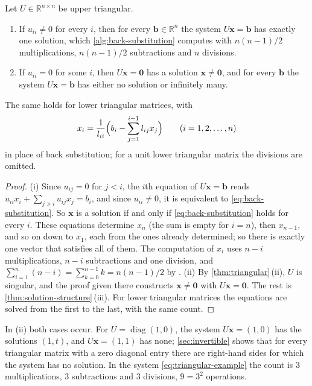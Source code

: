 \begin{proposition}
\label{prop:triangular-solve}
Let $U\in\mathbb R^{n\times n}$ be upper triangular.
\begin{enumerate}
\item If $u_{ii}\ne0$ for every $i$, then for every $\mathbf b\in\mathbb R^n$ the system $U\mathbf x=\mathbf b$ has exactly one solution, which \cref{alg:back-substitution} computes with $n(n-1)/2$ multiplications, $n(n-1)/2$ subtractions and $n$ divisions.
\item If $u_{ii}=0$ for some $i$, then $U\mathbf x=\mathbf 0$ has a solution $\mathbf x\ne\mathbf 0$, and for every $\mathbf b$ the system $U\mathbf x=\mathbf b$ has either no solution or infinitely many.
\end{enumerate}
The same holds for lower triangular matrices, with 
\[
x_i=\frac1{l_{ii}}\Bigl(b_i-\sum_{j=1}^{i-1}l_{ij}x_j\Bigr)\qquad(i=1,2,\ldots,n)
\]
in place of back substitution; for a unit lower triangular matrix the divisions are omitted.
\end{proposition}

\begin{proof}
(i) Since $u_{ij}=0$ for $j<i$, the $i$th equation of $U\mathbf x=\mathbf b$ reads $u_{ii}x_i+\sum_{j>i}u_{ij}x_j=b_i$, and since $u_{ii}\ne0$, it is equivalent to \eqref{eq:back-substitution}. So $\mathbf x$ is a solution if and only if \eqref{eq:back-substitution} holds for every $i$. These equations determine $x_n$ (the sum is empty for $i=n$), then $x_{n-1}$, and so on down to $x_1$, each from the ones already determined; so there is exactly one vector that satisfies all of them. The computation of $x_i$ uses $n-i$ multiplications, $n-i$ subtractions and one division, and $\sum_{i=1}^n(n-i)=\sum_{k=0}^{n-1}k=n(n-1)/2$ by . (ii) By \cref{thm:triangular}\,(ii), $U$ is singular, and the proof given there constructs $\mathbf x\ne\mathbf 0$ with $U\mathbf x=\mathbf 0$. The rest is \cref{thm:solution-structure}\,(iii). For lower triangular matrices the equations are solved from the first to the last, with the same count.
\end{proof}

In (ii) both cases occur. For $U=\operatorname{diag}(1,0)$, the system $U\mathbf x=(1,0)$ has the solutions $(1,t)$, and $U\mathbf x=(1,1)$ has none; \cref{sec:invertible} shows that for every triangular matrix with a zero diagonal entry there are right-hand sides for which the system has no solution. In the system \eqref{eq:triangular-example} the count is $3$ multiplications, $3$ subtractions and $3$ divisions, $9=3^2$ operations.

